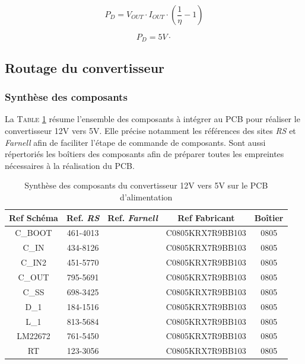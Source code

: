 			\begin{equation}
				P_D = V_{OUT}\cdot I_{OUT}\cdot\left(\frac{1}{\eta}-1\right)
			\end{equation}	
			
			\begin{equation}
				P_D  = 5V\cdot
			\end{equation}							
			
			
			
			\subsection{Routage du convertisseur}
			
				\subsubsection{Synthèse des composants}
				
				La \textsc{Table \ref{synth_composants}} résume l'ensemble des composants à intégrer au PCB pour réaliser le convertisseur 12V vers 5V. Elle précise notamment les références des sites \textit{RS} et \textit{Farnell} afin de faciliter l'étape de commande de composants. Sont aussi répertoriés les boîtiers des composants afin de préparer toutes les empreintes nécessaires à la réalisation du PCB.
				
				\begin{table}
					\begin{center}
						\begin{tabular}{|c|c|c|c|c|}
						\hline
						\textbf{Ref Schéma} & Ref. \textit{RS} & Ref. \textit{Farnell} & Ref Fabricant & Boîtier \\ 
						\hline
						C\_BOOT & 461-4013 & & C0805KRX7R9BB103 & 0805 \\
						\hline
						C\_IN & 434-8126 & & C0805KRX7R9BB103 & 0805 \\
						\hline
						C\_IN2 & 451-5770 & & C0805KRX7R9BB103 & 0805 \\
						\hline
						C\_OUT & 795-5691 & & C0805KRX7R9BB103 & 0805 \\
						\hline
						C\_SS & 698-3425 & & C0805KRX7R9BB103 & 0805 \\
						\hline
						D\_1 & 184-1516 & & C0805KRX7R9BB103 & 0805 \\
						\hline
						L\_1 & 813-5684 & & C0805KRX7R9BB103 & 0805 \\
						\hline
						LM22672 & 761-5450 & & C0805KRX7R9BB103 & 0805 \\
						\hline
						RT & 123-3056 & & C0805KRX7R9BB103 & 0805 \\
						\hline
						\end{tabular}
					\end{center}
					\caption{Synthèse des composants du convertisseur 12V vers 5V sur le PCB d'alimentation}
					\label{synth_composants}
				\end{table}
